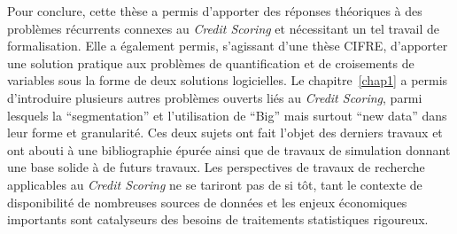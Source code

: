 \medskip

Pour conclure, cette thèse a permis d'apporter des réponses théoriques à des problèmes récurrents connexes au \textit{Credit Scoring} et nécessitant un tel travail de formalisation. Elle a également permis, s'agissant d'une thèse CIFRE, d'apporter une solution pratique aux problèmes de quantification et de croisements de variables sous la forme de deux solutions logicielles. Le chapitre~\ref{chap1} a permis d'introduire plusieurs autres problèmes ouverts liés au \textit{Credit Scoring}, parmi lesquels la ``segmentation'' et l'utilisation de ``Big'' mais surtout ``new data'' dans leur forme et granularité. Ces deux sujets ont fait l'objet des derniers travaux et ont abouti à une bibliographie épurée ainsi que de travaux de simulation donnant une base solide à de futurs travaux. Les perspectives de travaux de recherche applicables au \textit{Credit Scoring} ne se tariront pas de si tôt, tant le contexte de disponibilité de nombreuses sources de données et les enjeux économiques importants sont catalyseurs des besoins de traitements statistiques rigoureux.